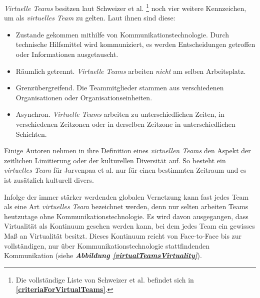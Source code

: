 \documentclass[a4paper,11pt]{article}%
\renewcommand{\\}{\vspace*{0.5\baselineskip} \newline}
\begin{document}
\textit{Virtuelle Teams} besitzen laut Schweizer et al. \citep[S. 270]{schweitzer2010conceptualizing}\footnote{Die vollständige Liste von Schweizer et al. befindet sich in \textbf{\autoref{criteriaForVirtualTeams}}.} noch vier weitere Kennzeichen, um als \textit{virtuelles Team} zu gelten. Laut ihnen sind diese:
\label{AnforderungenLautSchweitzer}
\begin{itemize}
\item Zustande gekommen mithilfe von Kommunikationstechnologie. Durch technische Hilfsmittel wird kommuniziert, es werden Entscheidungen getroffen oder Informationen ausgetauscht.
\item Räumlich getrennt. \textit{Virtuelle Teams} arbeiten \textit{nicht} am selben Arbeitsplatz.
\item Grenzübergreifend. Die Teammitglieder stammen aus verschiedenen Organisationen oder Organisationseinheiten.
\item Asynchron. \textit{Virtuelle Teams} arbeiten zu unterschiedlichen Zeiten, in verschiedenen Zeitzonen oder in derselben Zeitzone in unterschiedlichen Schichten.
\end{itemize}

Einige Autoren nehmen in ihre Definition eines \textit{virtuellen Teams} den Aspekt der zeitlichen Limitierung oder der kulturellen Diversität auf. So besteht ein \textit{virtuelles Team} für Jarvenpaa et al. \citep[S. 1-2]{jarvenpaa1999communication} nur für einen bestimmten Zeitraum und es ist zusätzlich kulturell divers.

Infolge der immer stärker werdenden globalen Vernetzung kann fast jedes Team als eine Art \textit{virtuelles Team} bezeichnet werden, denn nur selten arbeiten Teams heutzutage ohne Kommunikationstechnologie. 
Es wird davon ausgegangen, dass Virtualität als Kontinuum gesehen werden kann, bei dem jedes Team ein gewisses Maß an Virtualität besitzt. Dieses Kontinuum reicht von Face-to-Face bis zur vollständigen, nur über Kommunikationstechnologie stattfindenden Kommunikation \citep{martins2004virtual} (siehe \textbf{\textit{Abbildung \ref{virtualTeamsVirtuality}}}).
\end{document}
